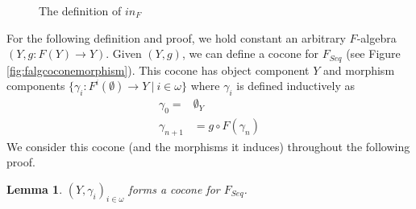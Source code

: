 \documentclass{msthesis}
\newtheorem{lemma}[theorem]{Lemma}
\theoremstyle{definition}
\begin{document}
\begin{figure}[htbp]
    \centering
{    
    \caption{The definition of $in_F$}\label{fig:infcoconemorphism}
    \label{fig:initalg_in}
}
\end{figure}

For the following definition and proof, we hold constant  an arbitrary $F$-algebra $(Y, g : F(Y) \to Y)$.  Given $(Y, g)$, we can define a cocone for $F_{Seq}$ (see Figure \ref{fig:falgcoconemorphism}).  This cocone has object component $Y$ and morphism components $\{\gamma_i : F^i(\emptyset) \to Y\ |\ i \in \omega\}$ where $\gamma_i$ is defined inductively as
    \begin{align*}
        \gamma_0 =& \emptyset_Y \\
        \gamma_{n+1} &= g \circ F(\gamma_n)
    \end{align*}
We consider this cocone (and the morphisms it induces) throughout the following proof.

\begin{lemma}
    $(Y, \gamma_i)_{i \in \omega}$ forms a cocone for $F_{Seq}$.
\end{lemma}
\end{document}
